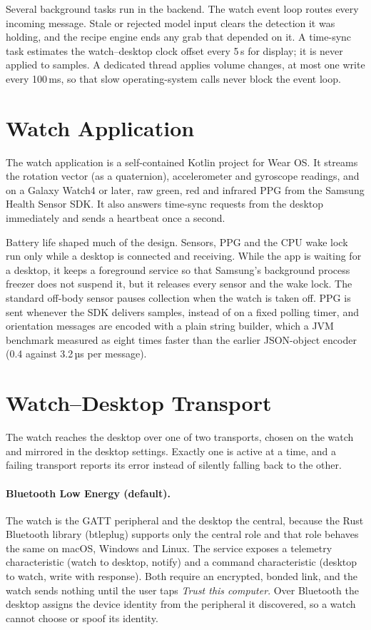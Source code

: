 Several background tasks run in the backend. The watch event loop routes every incoming message. Stale or rejected model input clears the detection it was holding, and the recipe engine ends any grab that depended on it. A time-sync task estimates the watch--desktop clock offset every 5\,s for display; it is never applied to samples. A dedicated thread applies volume changes, at most one write every 100\,ms, so that slow operating-system calls never block the event loop.

\section{Watch Application}

The watch application is a self-contained Kotlin project for Wear OS. It streams the rotation vector (as a quaternion), accelerometer and gyroscope readings, and on a Galaxy Watch4 or later, raw green, red and infrared PPG from the Samsung Health Sensor SDK. It also answers time-sync requests from the desktop immediately and sends a heartbeat once a second.

Battery life shaped much of the design. Sensors, PPG and the CPU wake lock run only while a desktop is connected and receiving. While the app is waiting for a desktop, it keeps a foreground service so that Samsung's background process freezer does not suspend it, but it releases every sensor and the wake lock. The standard off-body sensor pauses collection when the watch is taken off. PPG is sent whenever the SDK delivers samples, instead of on a fixed polling timer, and orientation messages are encoded with a plain string builder, which a JVM benchmark measured as eight times faster than the earlier JSON-object encoder (0.4 against 3.2\,µs per message).

\section{Watch--Desktop Transport}

The watch reaches the desktop over one of two transports, chosen on the watch and mirrored in the desktop settings. Exactly one is active at a time, and a failing transport reports its error instead of silently falling back to the other.

\paragraph{Bluetooth Low Energy (default).} The watch is the GATT peripheral and the desktop the central, because the Rust Bluetooth library (btleplug) supports only the central role and that role behaves the same on macOS, Windows and Linux. The service exposes a telemetry characteristic (watch to desktop, notify) and a command characteristic (desktop to watch, write with response). Both require an encrypted, bonded link, and the watch sends nothing until the user taps \emph{Trust this computer}. Over Bluetooth the desktop assigns the device identity from the peripheral it discovered, so a watch cannot choose or spoof its identity.

